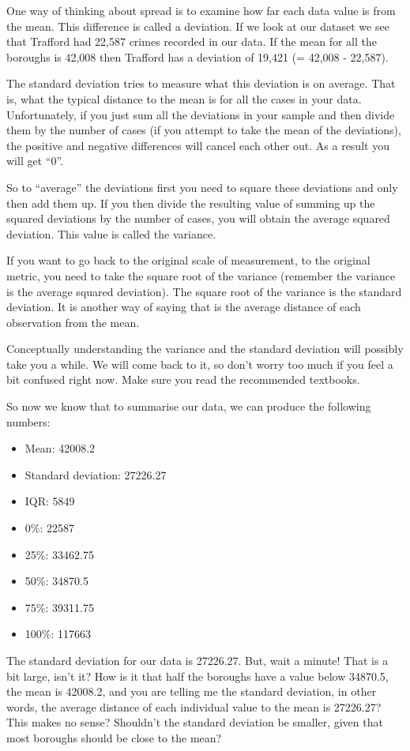 \documentclass[]{book}
\providecommand{\tightlist}{%
  \setlength{\itemsep}{0pt}\setlength{\parskip}{0pt}}
\theoremstyle{definition}
\theoremstyle{definition}
\theoremstyle{definition}
\theoremstyle{remark}
\begin{document}
One way of thinking about spread is to examine how far each data value
is from the mean. This difference is called a deviation. If we look at
our dataset we see that Trafford had 22,587 crimes recorded in our data.
If the mean for all the boroughs is 42,008 then Trafford has a deviation
of 19,421 (= 42,008 - 22,587).

The standard deviation tries to measure what this deviation is on
average. That is, what the typical distance to the mean is for all the
cases in your data. Unfortunately, if you just sum all the deviations in
your sample and then divide them by the number of cases (if you attempt
to take the mean of the deviations), the positive and negative
differences will cancel each other out. As a result you will get ``0''.

So to ``average'' the deviations first you need to square these
deviations and only then add them up. If you then divide the resulting
value of summing up the squared deviations by the number of cases, you
will obtain the average squared deviation. This value is called the
variance.

If you want to go back to the original scale of measurement, to the
original metric, you need to take the square root of the variance
(remember the variance is the average squared deviation). The square
root of the variance is the standard deviation. It is another way of
saying that is the average distance of each observation from the mean.

Conceptually understanding the variance and the standard deviation will
possibly take you a while. We will come back to it, so don't worry too
much if you feel a bit confused right now. Make sure you read the
recommended textbooks.

So now we know that to summarise our data, we can produce the following
numbers:

\begin{itemize}
\tightlist
\item
  Mean: 42008.2
\item
  Standard deviation: 27226.27
\item
  IQR: 5849
\item
  0\%: 22587
\item
  25\%: 33462.75
\item
  50\%: 34870.5
\item
  75\%: 39311.75
\item
  100\%: 117663
\end{itemize}

The standard deviation for our data is 27226.27. But, wait a minute!
That is a bit large, isn't it? How is it that half the boroughs have a
value below 34870.5, the mean is 42008.2, and you are telling me the
standard deviation, in other words, the average distance of each
individual value to the mean is 27226.27? This makes no sense? Shouldn't
the standard deviation be smaller, given that most boroughs should be
close to the mean?
\end{document}
